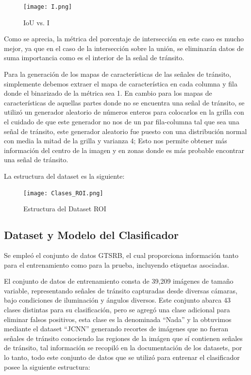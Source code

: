     \begin{figure}[ht]
        \centering
        \texttt{[image: I.png]}
        \caption{IoU vs. I}
    \end{figure}

    Como se aprecia, la métrica del porcentaje de intersección en este caso es mucho mejor, ya que en el caso de la intersección sobre la unión, se eliminarán datos de suma importancia como es el interior de la señal de tránsito.

    Para la generación de los mapas de características de las señales de tránsito, simplemente debemos extraer el mapa de característica en cada columna y fila donde el binarizado de la métrica sea 1. En cambio para los mapas de características de aquellas partes donde no se encuentra una señal de tránsito, se utilizó un generador aleatorio de números enteros para colocarlos en la grilla con el cuidado de que este generador no nos de un par fila-columna tal que sea una señal de tránsito, este generador aleatorio fue puesto con una distribución normal con media la mitad de la grilla y varianza 4; Esto nos permite obtener más información del centro de la imagen y en zonas donde es más probable encontrar una señal de tránsito.

    La estructura del dataset es la siguiente:
    
    \begin{figure}[ht]
        \centering
        \texttt{[image: Clases\_ROI.png]}
        \caption{Estructura del Dataset ROI}
    \end{figure}


    \subsection{Dataset y Modelo del Clasificador}
    Se empleó el conjunto de datos GTSRB, el cual proporciona información tanto para el entrenamiento como para la prueba, incluyendo etiquetas asociadas.

    El conjunto de datos de entrenamiento consta de 39,209 imágenes de tamaño variable, representando señales de tránsito capturadas desde diversas cámaras, bajo condiciones de iluminación y ángulos diversos. 
    Este conjunto abarca 43 clases distintas para su clasificación, pero se agregó una clase adicional para eliminar falsos positivos, esta clase es la denominada ``Nada'' y la obtuvimos mediante el dataset ``JCNN'' generando recortes de imágenes que no fueran señales de tránsito conociendo las regiones de la imágen que sí contienen señales de tránsito, tal información se recopiló en la documentación de los datasets, por lo tanto, todo este conjunto de datos que se utilizó para entrenar el clasificador posee la siguiente estructura:
    
